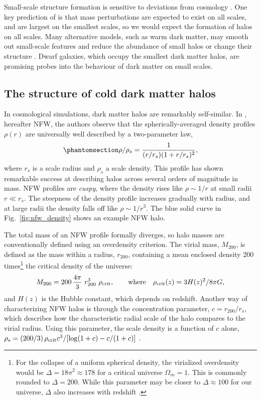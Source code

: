 Small-scale structure formation is sensitive to deviations from \LCDM{}
cosmology \citep[e.g.,][]{bechtol+2022}. One key prediction of \LCDM{}
is that mass perturbations are expected to exist on all scales, and are
largest on the smallest scales, so we would expect the formation of
halos on all scales. Many alternative models, such as warm dark matter,
may smooth out small-scale features and reduce the abundance of small
halos or change their structure \citep[e.g.,][]{lovell+2014}. Dwarf
galaxies, which occupy the smallest dark matter halos, are promising
probes into the behaviour of dark matter on small scales.

\subsection{The structure of cold dark matter halos}\label{sec:NFW}

In \LCDM{} cosmological simulations, dark matter halos are remarkably
self-similar. In \citet{NFW1996, NFW1997}, hereafter NFW, the authors
observe that the spherically-averaged density profiles \(\rho(r)\) are
universally well described by a two-parameter law,
\begin{equation}\protect\phantomsection\label{eq:nfw}{
\rho/\rho_s= \frac{1}{(r/r_s)(1+r/r_s)^2},
}\end{equation} where \(r_s\) is a scale radius and \(\rho_s\) a scale
density. This profile has shown remarkable success at describing \LCDM{}
halos across several orders of magnitude in mass. NFW profiles are
\emph{cuspy}, where the density rises like \(\rho \sim 1/r\) at small
radii \(r \ll r_s\). The steepness of the density profile increases
gradually with radius, and at large radii the density falls off like
\(\rho \sim 1/r^3\). The blue solid curve in Fig.~\ref{fig:nfw_density}
shows an example NFW halo.

The total mass of an NFW profile formally diverges, so halo masses are
conventionally defined using an overdensity criterion. The virial mass,
\(M_{200}\), is defined as the mass within a radius, \(r_{200}\),
containing a mean enclosed density 200 times\footnote{For the collapse
  of a uniform spherical density, the virialized overdensity would be
  \(\Delta = 18\pi^2\approx 178\) for a critical universe
  \(\Omega_m = 1\). This is commonly rounded to \(\Delta = 200\). While
  this parameter may be closer to \(\Delta \approx 100\) for our
  universe, \(\Delta\) also increases with redshift \citep[using eq. 6
  from][]{bryan+norman1998}.} the critical density of the universe:
\begin{equation}{
M_{200} =200\,\frac{4\pi}{3} \ r_{200}^3\ \rho_{\rm crit}, \qquad {\rm where} \quad \rho_{\rm crit}(z) = 3H(z)^2 / 8\pi G,
}\end{equation} and \(H(z)\) is the Hubble constant, which depends on
redshift. Another way of characterizing NFW halos is through the
concentration parameter, \(c=r_{200} / r_s\), which describes how the
characteristic radial scale of the halo compares to the virial radius.
Using this parameter, the scale density is a function of \(c\) alone,
\(\rho_s = (200/3)\,\rho_{\rm crit} c^3 / [\log(1+c) - c/(1+c)]\)
\citep{NFW1996}.

